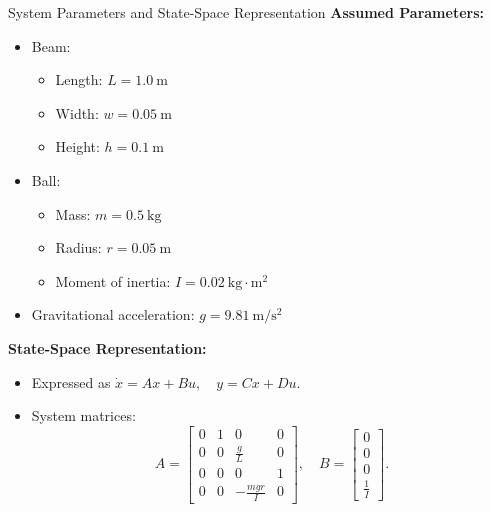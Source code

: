 \documentclass{beamer}
\begin{document}
\begin{frame}{System Parameters and State-Space Representation}
    \textbf{\small Assumed Parameters:}
    \begin{itemize}
        \small
        \item \small Beam:
        \begin{itemize}
            \footnotesize
            \item Length: \(L = 1.0\ \mathrm{m}\)
            \item Width: \(w = 0.05\ \mathrm{m}\)
            \item Height: \(h = 0.1\ \mathrm{m}\)
        \end{itemize}
        \item \small Ball:
        \begin{itemize}
            \footnotesize
            \item Mass: \(m = 0.5\ \mathrm{kg}\)
            \item Radius: \(r = 0.05\ \mathrm{m}\)
            \item Moment of inertia: \(I = 0.02\ \mathrm{kg{\cdot}m^2}\)
        \end{itemize}
        \item \small Gravitational acceleration: \(g = 9.81\ \mathrm{m/s^2}\)
    \end{itemize}

    \vspace{0.2cm}
    \textbf{\small State-Space Representation:}
    \begin{itemize}
        \footnotesize
        \item Expressed as \(\dot{x} = A x + B u, \quad y = C x + D u\).
        \item System matrices:
        \[
        A = \begin{bmatrix} 
        0 & 1 & 0 & 0 \\
        0 & 0 & \frac{g}{L} & 0 \\
        0 & 0 & 0 & 1 \\
        0 & 0 & -\frac{m g r}{I} & 0 
        \end{bmatrix}, \quad 
        B = \begin{bmatrix} 
        0 \\ 
        0 \\ 
        0 \\ 
        \frac{1}{I} 
        \end{bmatrix}.
        \]
    \end{itemize}
\end{frame}
\end{document}
